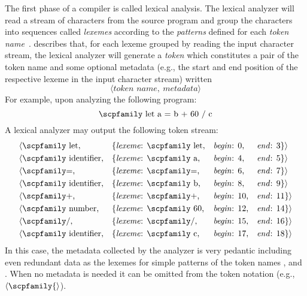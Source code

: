 \documentclass[
  oneside,
  english,
  coorientadorbanca,
  noabntexcite
]{ufsc-thesis-rn46-2019}
\newcommand{\codett}[1]{\text{\scpfamily#1}}
\newcommand{\token}[1]{$\langle\codett{#1}\rangle$}
\newcommand{\tokenstream}[4]{
  & \langle\text{#1,} && \text{\{\textit{lexeme}: #2,} && \text{\textit{begin}: #3,} && \text{\textit{end}: #4\}}\rangle%
}
\begin{document}
The first phase of a compiler is called lexical analysis.
The lexical analyzer will read a stream of characters from the source program and group the characters into sequences called \textit{lexemes} according to the \textit{patterns} defined for each \textit{token name}~\cite{Aho:2006:CPT:1177220}.
\textcite{Aho:2006:CPT:1177220} describes that, for each lexeme grouped by reading the input character stream, the lexical analyzer will generate a \textit{token} which constitutes a pair of the token name and some optional metadata (e.g., the start and end position of the respective lexeme in the input character stream) written
\begin{equation*}
  \langle \textit{token name},\ \textit{metadata}\rangle
\end{equation*}
For example, upon analyzing the following program:
\begin{equation*}
  \codett{let a = b + 60 / c}
\end{equation*}
A lexical analyzer may output the following token stream:
\begin{equation}\label{figure:introduction_token_stream}
  \begin{aligned}
    \tokenstream{\codett{let}}{\codett{let}}{$0$}{$3$}      \\
    \tokenstream{\codett{identifier}}{\codett{a}}{$4$}{$5$} \\
    \tokenstream{\codett{=}}{\codett{=}}{$6$}{$7$}          \\
    \tokenstream{\codett{identifier}}{\codett{b}}{$8$}{$9$} \\
    \tokenstream{\codett{+}}{\codett{+}}{$10$}{$11$}        \\
    \tokenstream{\codett{number}}{\codett{60}}{$12$}{$14$}  \\
    \tokenstream{\codett{/}}{\codett{/}}{$15$}{$16$}        \\
    \tokenstream{\codett{identifier}}{\codett{c}}{$17$}{$18$}
  \end{aligned}
\end{equation}
In this case, the metadata collected by the analyzer is very pedantic including even redundant data as the lexemes for simple patterns of the token names \codett{=}, \codett{+} and \codett{/}.
When no metadata is needed it can be omitted from the token notation (e.g., \token{\{}).
\end{document}
